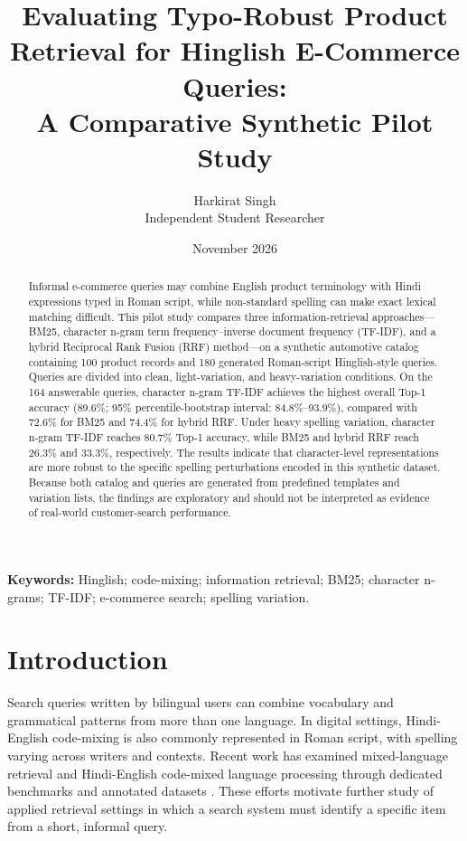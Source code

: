 \documentclass[11pt,a4paper]{article}
\title{\textbf{Evaluating Typo-Robust Product Retrieval for Hinglish E-Commerce Queries:}\\[0.35em]
\large A Comparative Synthetic Pilot Study}
\author{Harkirat Singh\\\normalsize Independent Student Researcher}
\date{November 2026}
\begin{document}
\maketitle

\begin{abstract}
Informal e-commerce queries may combine English product terminology with Hindi expressions typed in Roman script, while non-standard spelling can make exact lexical matching difficult. This pilot study compares three information-retrieval approaches---BM25, character n-gram term frequency--inverse document frequency (TF-IDF), and a hybrid Reciprocal Rank Fusion (RRF) method---on a synthetic automotive catalog containing 100 product records and 180 generated Roman-script Hinglish-style queries. Queries are divided into clean, light-variation, and heavy-variation conditions. On the 164 answerable queries, character n-gram TF-IDF achieves the highest overall Top-1 accuracy (89.6\%; 95\% percentile-bootstrap interval: 84.8\%--93.9\%), compared with 72.6\% for BM25 and 74.4\% for hybrid RRF. Under heavy spelling variation, character n-gram TF-IDF reaches 80.7\% Top-1 accuracy, while BM25 and hybrid RRF reach 26.3\% and 33.3\%, respectively. The results indicate that character-level representations are more robust to the specific spelling perturbations encoded in this synthetic dataset. Because both catalog and queries are generated from predefined templates and variation lists, the findings are exploratory and should not be interpreted as evidence of real-world customer-search performance.
\end{abstract}
\noindent\textbf{Keywords:} Hinglish; code-mixing; information retrieval; BM25; character n-grams; TF-IDF; e-commerce search; spelling variation.

\section{Introduction}
Search queries written by bilingual users can combine vocabulary and grammatical patterns from more than one language. In digital settings, Hindi-English code-mixing is also commonly represented in Roman script, with spelling varying across writers and contexts. Recent work has examined mixed-language retrieval and Hindi-English code-mixed language processing through dedicated benchmarks and annotated datasets \citep{kim2025milq,sheth2025comi,yang2025codemixbench}. These efforts motivate further study of applied retrieval settings in which a search system must identify a specific item from a short, informal query.
\end{document}
